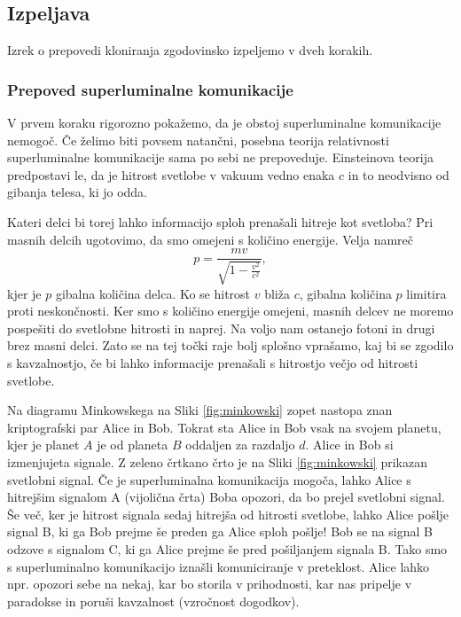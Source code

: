 \documentclass[12pt]{article}
\begin{document}
 \subsection{Izpeljava}
Izrek o prepovedi kloniranja zgodovinsko izpeljemo v dveh korakih. 
\subsubsection{Prepoved superluminalne komunikacije}
V prvem koraku rigorozno pokažemo, da je obstoj superluminalne komunikacije nemogoč. Če želimo biti povsem natančni, posebna teorija relativnosti superluminalne komunikacije sama po sebi ne prepoveduje. Einsteinova teorija predpostavi le, da je hitrost svetlobe v vakuum vedno enaka $c$ in to neodvisno od gibanja telesa, ki jo odda. \par Kateri delci bi torej lahko informacijo sploh prenašali hitreje kot svetloba? Pri masnih delcih ugotovimo, da smo omejeni s količino energije. Velja namreč
\begin{equation}
p = \frac{mv}{\sqrt{1-\frac{v^2}{c^2}}},
\end{equation}
kjer je $p$ gibalna količina delca. Ko se hitrost $v$ bliža $c$, gibalna količina $p$ limitira proti neskončnosti. Ker smo s količino energije omejeni, masnih delcev ne moremo pospešiti do svetlobne hitrosti in naprej. Na voljo nam ostanejo fotoni in drugi brez masni delci. Zato se na tej točki raje bolj splošno vprašamo, kaj bi se zgodilo s kavzalnostjo, če bi lahko informacije prenašali s hitrostjo večjo od hitrosti svetlobe. \cite{marcocerezoEntangledParticlesFaster2015}
\par
Na diagramu Minkowskega na Sliki \ref{fig:minkowski} zopet nastopa znan kriptografski par Alice in Bob. Tokrat sta Alice in Bob vsak na svojem planetu, kjer je planet $A$ je od planeta $B$ oddaljen za razdaljo $d$. Alice in Bob si izmenjujeta signale. Z zeleno črtkano črto je na Sliki \ref{fig:minkowski} prikazan svetlobni signal. Če je superluminalna komunikacija mogoča, lahko Alice s hitrejšim signalom A (vijolična črta) Boba opozori, da bo prejel svetlobni signal. Še več, ker je hitrost signala sedaj hitrejša od hitrosti svetlobe, lahko Alice pošlje signal B, ki ga Bob prejme še preden ga Alice sploh pošlje! Bob se na signal B odzove s signalom C, ki ga Alice prejme še pred pošiljanjem signala B. Tako smo s superluminalno komunikacijo iznašli komuniciranje v preteklost. Alice lahko npr. opozori sebe na nekaj, kar bo storila v prihodnosti, kar nas pripelje v paradokse in poruši kavzalnost (vzročnost dogodkov). \cite{marcocerezoEntangledParticlesFaster2015}
\end{document}
